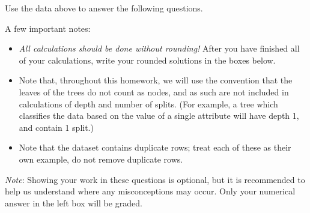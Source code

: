 \documentclass[11pt,addpoints,answers]{exam}
\begin{document}
Use the data above to answer the following questions. 

\begin{notebox}
A few important notes:
\begin{itemize}
    \item \emph{All calculations should be done without rounding!} After you have finished all of your calculations, write your rounded solutions in the boxes below.
    \item Note that, throughout this homework, we will use the convention that the leaves of the trees do not count as nodes, and as such are not included in calculations of depth and number of splits. (For example, a tree which classifies the data based on the value of a single attribute will have depth 1, and contain 1 split.)
    \item Note that the dataset contains duplicate rows; treat each of these as their own example, do not remove duplicate rows.
\end{itemize}
\end{notebox}

\textit{Note}: Showing your work in these questions is optional, but it is recommended to help us understand where any misconceptions may occur. Only your numerical answer in the left box will be graded.

\end{document}

